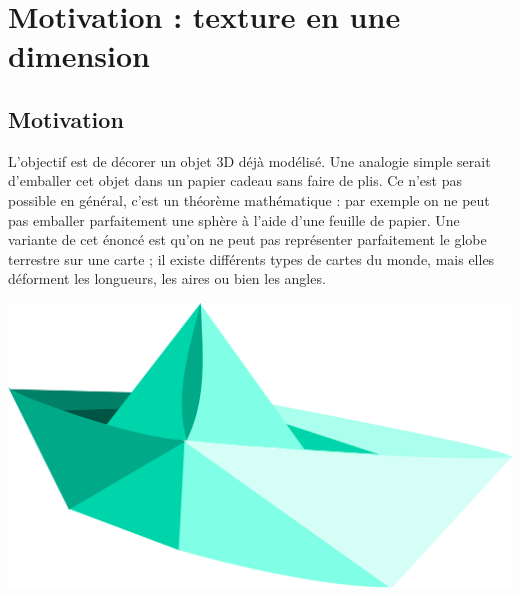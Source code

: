 \documentclass[11pt,class=report,crop=false]{standalone}
\begin{document}

%
%
%





\section{Motivation : texture en une dimension}


\subsection{Motivation}

L'objectif est de décorer un objet 3D déjà modélisé.
Une analogie simple serait d'emballer cet objet dans un papier cadeau sans faire de plis. Ce n'est pas possible en général, c'est un théorème mathématique : par exemple on ne peut pas emballer parfaitement une sphère à l'aide d'une feuille de papier. Une variante de cet énoncé est qu'on ne peut pas représenter parfaitement le globe terrestre sur une carte ; il existe différents types de cartes du monde, mais elles déforment les longueurs, les aires ou bien les angles.

\begin{center}
\includegraphics[scale=\myscale,scale=0.4]{figures/badaman-paper-boat}
\end{center}
\end{document}
